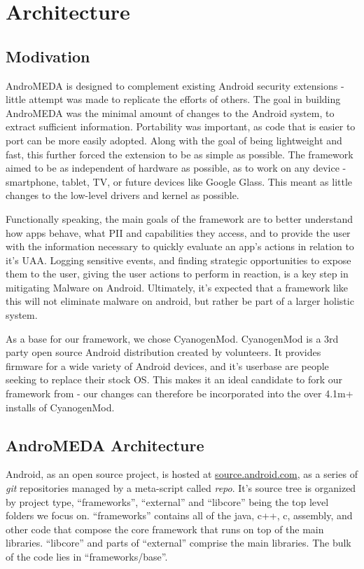 \chapter{Architecture}
\label{sec:architecture}

\section{Modivation}
AndroMEDA is designed to complement existing Android security extensions - little attempt was made to replicate the efforts of others. The goal in building AndroMEDA was the minimal amount of changes to the Android system, to extract sufficient information. Portability was important, as code that is easier to port can be more easily adopted. Along with the goal of being lightweight and fast, this further forced the extension to be as simple as possible. The framework aimed to be as independent of hardware as possible, as to work on any device - smartphone, tablet, TV, or future devices like Google Glass. This meant as little changes to the low-level drivers and kernel as possible.

Functionally speaking, the main goals of the framework are to better understand how apps behave, what PII and capabilities they access, and to provide the user with the information necessary to quickly evaluate an app's actions in relation to it's UAA. Logging sensitive events, and finding strategic opportunities to expose them to the user, giving the user actions to perform in reaction, is a key step in mitigating Malware on Android. Ultimately, it's expected that a framework like this will not eliminate malware on android, but rather be part of a larger holistic system.

As a base for our framework, we chose CyanogenMod\citep{cyanogenmod}. CyanogenMod is a 3rd party open source Android distribution created by volunteers. It provides firmware for a wide variety of Android devices, and it's userbase are people seeking to replace their stock OS. This makes it an ideal candidate to fork our framework from - our changes can therefore be incorporated into the over 4.1m+ installs of CyanogenMod\citep{cyanogenmodstats}.

\section{AndroMEDA Architecture}
Android, as an open source project, is hosted at \url{source.android.com}\citep{androidsource}, as a series of \textit{git} repositories managed by a meta-script called \textit{repo}. It's source tree is organized by project type, ``frameworks'', ``external'' and ``libcore'' being the top level folders we focus on. ``frameworks'' contains all of the java, c++, c, assembly, and other code that compose the core framework that runs on top of the main libraries. ``libcore'' and parts of ``external'' comprise the main libraries. The bulk of the code lies in ``frameworks/base''.

